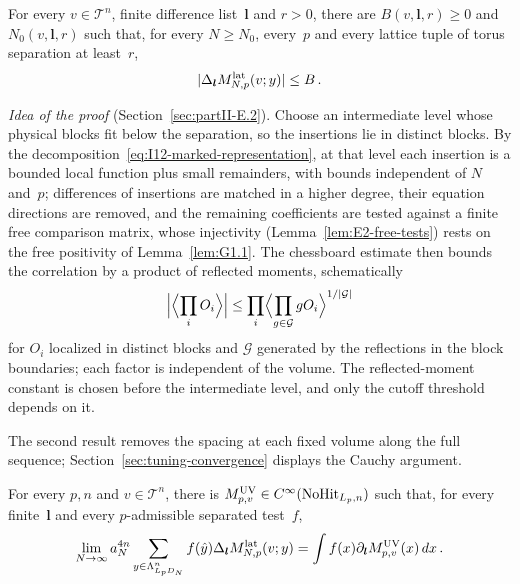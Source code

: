 \begin{proposition}\label{prop:UB}
For every $v\in\mathcal T^n$, finite difference list~$\boldsymbol l$ and $r>0$, there are $B(v,\boldsymbol l,r)\ge0$ and $N_0(v,\boldsymbol l,r)$ such that, for every $N\ge N_0$, every~$p$ and every lattice tuple of torus separation at least~$r$,
\begin{equation*}
|\Delta_{\boldsymbol l}M^{\mathrm{lat}}_{N,p}(v;y)|\le B\,.
\end{equation*}
\end{proposition}

\emph{Idea of the proof} (Section~\ref{sec:partII-E.2}). Choose an intermediate level whose physical blocks fit below the separation, so the insertions lie in distinct blocks. By the decomposition~\eqref{eq:I12-marked-representation}, at that level each insertion is a bounded local function plus small remainders, with bounds independent of $N$ and~$p$; differences of insertions are matched in a higher degree, their equation directions are removed, and the remaining coefficients are tested against a finite free comparison matrix, whose injectivity (Lemma~\ref{lem:E2-free-tests}) rests on the free positivity of Lemma~\ref{lem:G1.1}. The chessboard estimate then bounds the correlation by a product of reflected moments, schematically
\begin{equation*}
\Bigl|\Bigl\langle\prod_iO_i\Bigr\rangle\Bigr|\le\prod_i\Bigl\langle\prod_{g\in\mathcal G}gO_i\Bigr\rangle^{1/|\mathcal G|}
\end{equation*}
for $O_i$ localized in distinct blocks and $\mathcal G$ generated by the reflections in the block boundaries; each factor is independent of the volume. The reflected-moment constant is chosen before the intermediate level, and only the cutoff threshold depends on it.

The second result removes the spacing at each fixed volume along the full sequence; Section~\ref{sec:tuning-convergence} displays the Cauchy argument.

\begin{theorem}\label{prop:UV}\label{thm:UV}
For every $p,n$ and $v\in\mathcal T^n$, there is $M^{\rm UV}_{p,v}\in C^\infty(\mathrm{NoHit}_{L_p,n})$ such that, for every finite~$\boldsymbol l$ and every $p$-admissible separated test~$f$,
\begin{equation*}
\lim_{N\to\infty}a_N^{4n}\sum_{y\in\Lambda_{L_pD_N}^n}f(\hat y)\Delta_{\boldsymbol l}M^{\mathrm{lat}}_{N,p}(v;y)
=\int f(x)\partial_{\boldsymbol l}M^{\rm UV}_{p,v}(x)\,dx\,.
\end{equation*}
\end{theorem}


